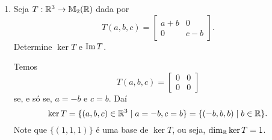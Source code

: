 \begin{exemplos}
	\begin{enumerate}
		\item Seja $T : \mathbb{R}^3 \to \mathbb{M}_2(\mathbb{R})$ dada por
		\[
			T(a,b,c) = \begin{bmatrix}
				a + b & 0\\
				0 & c - b
			\end{bmatrix}.
		\]
		Determine $\ker T$ e ${\rm Im\,} T$.
		\begin{solucao}
			Temos
			\[
				T(a,b,c) = \begin{bmatrix}
					0 & 0\\
					0 & 0
				\end{bmatrix}
			\]
			se, e só se, $a = -b$ e $c = b$. Daí
			\[
				\ker T = \{(a,b,c) \in \mathbb{R}^3 \mid a = -b, c = b\} = \{(-b,b,b) \mid b \in \mathbb{R}\}.
			\]
			Note que $\{(1,1,1)\}$ é uma base de $\ker T$, ou seja, $\dim_{\mathbb{R}} \ker T = 1$.


\end{solucao}
\end{enumerate}
\end{exemplos}
